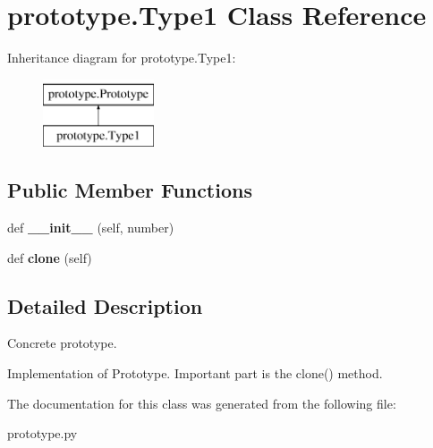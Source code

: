 \hypertarget{classprototype_1_1_type1}{}\section{prototype.\+Type1 Class Reference}
\label{classprototype_1_1_type1}
Inheritance diagram for prototype.\+Type1\+:\begin{figure}[H]
\begin{center}
\leavevmode
\includegraphics[height=2.000000cm]{classprototype_1_1_type1}
\end{center}
\end{figure}
\subsection*{Public Member Functions}
\begin{DoxyCompactItemize}
\item 
\mbox{\label{classprototype_1_1_type1_aa9d24cececd5e64697e9b0869fc7be37}} 
def {\bfseries \+\_\+\+\_\+init\+\_\+\+\_\+} (self, number)
\item 
\mbox{\label{classprototype_1_1_type1_a14acd74005626171d11916bce618a421}} 
def {\bfseries clone} (self)
\end{DoxyCompactItemize}


\subsection{Detailed Description}
\begin{DoxyVerb}Concrete prototype.

Implementation of Prototype. Important part is the
clone() method.
\end{DoxyVerb}
 

The documentation for this class was generated from the following file\+:\begin{DoxyCompactItemize}
\item 
prototype.\+py\end{DoxyCompactItemize}
